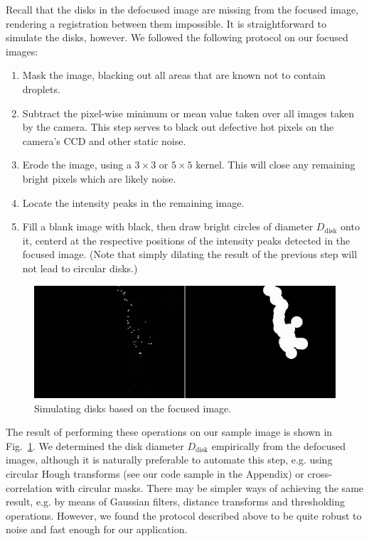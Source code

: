 \documentclass[11.5pt,oneside]{book}
\newcommand*{\figref}[1]{Fig.~\ref{#1}}
\begin{document}
Recall that the disks in the defocused image are missing from the focused image,
rendering a registration between them impossible. It is straightforward to
simulate the disks, however. We followed the following protocol on our focused
images:
\begin{enumerate}
    \item Mask the image, blacking out all areas that are known not to contain
        droplets.
    \item Subtract the pixel-wise minimum or mean value taken over all images
        taken by the camera. This step serves to black out defective hot pixels
        on the camera's CCD and other static noise.
    \item Erode the image, using a $3\times 3$ or $5\times 5$ kernel. This will
        close any remaining bright pixels which are likely noise.
    \item Locate the intensity peaks in the remaining image.
    \item Fill a blank image with black, then draw bright circles of diameter
        $D_\text{disk}$ onto it, centerd at the respective positions of the
        intensity peaks detected in the focused image. (Note that simply dilating
        the result of the previous step will not lead to circular disks.)
\end{enumerate}
\begin{figure}
    \centering
    \includegraphics[width=\textwidth]{img/orb/dilation.jpg}
    \caption{Simulating disks based on the focused image. \label{fig:making-disks}}
\end{figure}

The result of performing these operations on our sample image is shown in \figref{fig:making-disks}. We determined the disk diameter $D_\text{disk}$
empirically from the defocused images, although it is naturally preferable to
automate this step, e.g. using circular Hough transforms (see our code sample in
the Appendix) or cross-correlation
with circular masks. There may be simpler ways of achieving the same result,
e.g. by means of Gaussian filters, distance transforms and thresholding
operations. However, we found the protocol described above to be quite robust to
noise and fast enough for our application.
\end{document}
